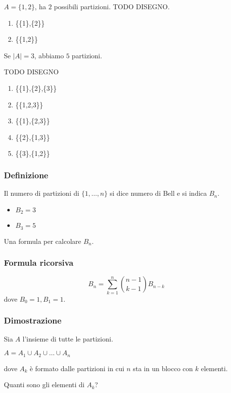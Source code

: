 \documentclass[11pt]{article}
\begin{document}
		$A = \{1,2\}$, ha $2$ possibili partizioni. TODO DISEGNO.

		\begin{enumerate}
			\item \{\{1\},\{2\}\}
			\item \{\{1,2\}\}
		\end{enumerate}

		Se $|A| = 3$, abbiamo $5$ partizioni.
		
		TODO DISEGNO
		\begin{enumerate}
			\item \{\{1\},\{2\},\{3\}\}
			\item \{\{1,2,3\}\}
			\item \{\{1\},\{2,3\}\}
			\item \{\{2\},\{1,3\}\}
			\item \{\{3\},\{1,2\}\}
		\end{enumerate}

		\subsubsection{Definizione}

		Il numero di partizioni di $\{1,\ldots,n\}$ si dice numero di Bell
		e si indica $B_n$.

		\begin{itemize}
			\item $B_2 = 3$
			\item $B_3 = 5$
		\end{itemize}

		Una formula per calcolare $B_n$.

		\subsubsection{Formula ricorsiva}
		
	\[
		B_n = \sum_{k=1}^{n}\binom{n-1}{k-1} B_{n-k}
	\]
		dove $B_0 = 1, B_1 = 1$.

		\subsubsection{Dimostrazione}

		Sia $A$ l'insieme di tutte le partizioni.

		$A = A_1 \cup A_2 \cup \ldots \cup A_n$
		
		dove $A_k$ \`e formato dalle partizioni in cui $n$ sta in un blocco con
		$k$ elementi.

		Quanti sono gli elementi di $A_k$?
\end{document}
